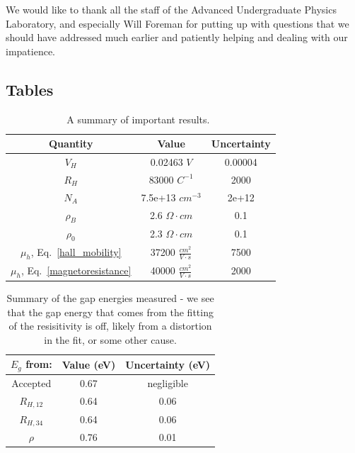 \documentclass[reprint, nobibnotes, amssymb, amsmath, amsfonts, physics, mathtools, mathrsfs, floatfix]{revtex4-1}
\begin{document}
    We would like to thank all the staff of the Advanced Undergraduate Physics Laboratory, and especially Will Foreman for putting up with questions that we should have addressed much earlier and patiently helping and dealing with our impatience.

    \subsection{Tables}

    \begin{table}[h]
      \begin{tabular}{|c|c|c|}
        \hline
        Quantity & Value & Uncertainty \\ \hline
        $V_H$ & 0.02463 $V$ & 0.00004 \\ \hline
        $R_H$ & 83000 $C^{-1}$ & 2000 \\ \hline
        $N_A$ &  7.5e+13 $cm^{-3}$ & 2e+12 \\ \hline
        $\rho_B$ & 2.6 $\Omega \cdot cm$ & 0.1 \\ \hline
        $\rho_0$ & 2.3 $\Omega \cdot cm$ & 0.1 \\ \hline
        $\mu_h$, Eq.~\ref{hall_mobility} & 37200 $\frac{cm^2}{V\cdot s}$ & 7500 \\ \hline
        $\mu_h$, Eq.~\ref{magnetoresistance} & 40000 $\frac{cm^2}{V\cdot s}$ & 2000 \\ \hline
      \end{tabular}
      \caption{A summary of important results.~\label{tab:results}}
    \end{table}

    \begin{table}[h]
      \begin{tabular}{|c|c|c|}
        \hline
        $E_g$ from: & Value (eV) & Uncertainty (eV) \\ \hline
        Accepted & 0.67 & negligible \\ \hline
        $R_{H, 12}$ & 0.64 & 0.06 \\ \hline
        $R_{H, 34}$ & 0.64 & 0.06 \\ \hline
        $\rho$ & 0.76 & 0.01 \\ \hline
      \end{tabular}
      \caption{Summary of the gap energies measured - we see that the gap energy that comes from the fitting of the resisitivity is off, likely from a distortion in the fit, or some other cause. \label{tab:eg}}
    \end{table}
\end{document}
